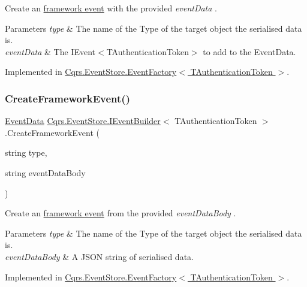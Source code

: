 Create an \hyperlink{}{framework event} with the provided {\itshape event\+Data} . 


\begin{DoxyParams}{Parameters}
{\em type} & The name of the Type of the target object the serialised data is.\\
\hline
{\em event\+Data} & The I\+Event$<$\+T\+Authentication\+Token$>$ to add to the Event\+Data.\\
\hline
\end{DoxyParams}


Implemented in \hyperlink{classCqrs_1_1EventStore_1_1EventFactory_a91394437675f3185d2105c6a79f7b5aa_a91394437675f3185d2105c6a79f7b5aa}{Cqrs.\+Event\+Store.\+Event\+Factory$<$ T\+Authentication\+Token $>$}.

\mbox{\label{interfaceCqrs_1_1EventStore_1_1IEventBuilder_a8e3df7af1f54ac873d1a768b78b82c6d_a8e3df7af1f54ac873d1a768b78b82c6d}} 
\subsubsection{\texorpdfstring{Create\+Framework\+Event()}{CreateFrameworkEvent()}\hspace{0.1cm}{\footnotesize\ttfamily [4/4]}}
{\footnotesize\ttfamily \hyperlink{classCqrs_1_1Events_1_1EventData}{Event\+Data} \hyperlink{interfaceCqrs_1_1EventStore_1_1IEventBuilder}{Cqrs.\+Event\+Store.\+I\+Event\+Builder}$<$ T\+Authentication\+Token $>$.Create\+Framework\+Event (\begin{DoxyParamCaption}\item[{string}]{type,  }\item[{string}]{event\+Data\+Body }\end{DoxyParamCaption})}



Create an \hyperlink{}{framework event} from the provided {\itshape event\+Data\+Body} . 


\begin{DoxyParams}{Parameters}
{\em type} & The name of the Type of the target object the serialised data is.\\
\hline
{\em event\+Data\+Body} & A J\+S\+ON string of serialised data.\\
\hline
\end{DoxyParams}


Implemented in \hyperlink{classCqrs_1_1EventStore_1_1EventFactory_a9e04e262a8af8f60bdde7b4bf3eafebb_a9e04e262a8af8f60bdde7b4bf3eafebb}{Cqrs.\+Event\+Store.\+Event\+Factory$<$ T\+Authentication\+Token $>$}.

